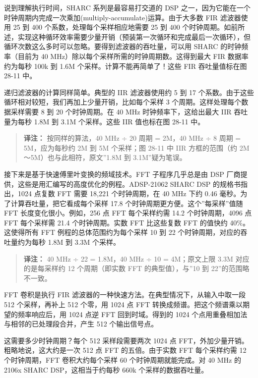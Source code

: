说到理解执行时间，SHARC 系列是最容易打交道的 DSP
之一，因为它能在一个时钟周期内完成一次乘加(multiply-accumulate)运算。由于大多数
FIR 滤波器使用 25 到 400 个系数，处理每个采样相应地需要 25 到 400
个时钟周期。如前所述，实现这种循环效率需要少量开销（预装第一次循环和完成最后一次循环），但循环次数这么多时可以忽略。要得到滤波器的吞吐量，可以用
SHARC 的时钟频率（目前为 40
MHz）除以每个采样所需的时钟周期数。这得到最大 FIR 数据率约为每秒 100k 到
1.6M 个采样。计算不能再简单了！这些 FIR 吞吐量值标在图 28-11 中。

递归滤波器的计算同样简单。典型的 IIR 滤波器使用约 5 到 17
个系数。由于这些循环相对较短，我们再加上少量开销，比如每个采样 3
个周期。这样处理每个数据采样需要 8 到 20 个时钟周期。在 40 MHz
时钟频率下，这给出最大 IIR 吞吐量为每秒 1.8M 到 3.1M 个采样。这些 IIR
值也标在图 28-11 中。

\begin{quote}
\textbf{译注：} 按同样的算法，40 MHz ÷ 20 周期 = 2M，40 MHz ÷ 8 周期 =
5M，应为每秒约 2M 到 5M 个采样；图 28-11 中 IIR 方框的范围（约
2M～5M）也与此相符，原文''1.8M 到 3.1M''疑为笔误。
\end{quote}

接下来是基于快速傅里叶变换的频域技术。FFT 子程序几乎总是由 DSP
厂商提供，这些是用汇编写的高度优化的例程。ADSP-21062 SHARC DSP
的规格书指出，1024 点复数 FFT 需要 18,221 个时钟周期，在 40 MHz 下约
0.46 毫秒。为了计算吞吐量，把它看成每个采样 17.8
个时钟周期更方便。这个''每采样''值随 FFT 长度变化很小。例如，256 点 FFT
每个采样约需 14.2 个时钟周期，4096 点 FFT 每个采样需 21.4
个时钟周期。实数 FFT 比这些复数 FFT 的值快约 40\%。这使得所有 FFT
例程的总体范围约为每个采样 10 到 22 个时钟周期，对应的吞吐量约为每秒
1.8M 到 3.3M 个采样。

\begin{quote}
\textbf{译注：} 40 MHz ÷ 22 = 1.8M，40 MHz ÷ 10 = 4M；原文上限 3.3M
对应的是每采样约 12 个周期（即实数 FFT 的典型值），与''10 到
22''的范围略不一致。
\end{quote}

FFT 卷积是执行 FIR 滤波器的一种快速方法。在典型情况下，从输入中取一段
512 个采样，再补上 512 个零，用 1024 点 FFT
转换成频谱。把这个频谱乘以期望的频率响应后，用 1024 点逆 FFT
回到时域。得到的 1024 个点用重叠相加法与相邻的已处理段合并，产生 512
个输出信号点。

这需要多少时钟周期？每个 512 采样段需要两次 1024 点
FFT，外加少量开销。粗略地说，这大约是一次 512 点 FFT 的五倍。由于实数
FFT 每个采样约需 12 个时钟周期，FFT 卷积大约每个采样 60
个时钟周期就能完成。对 40 MHz 的 2106x SHARC DSP，这相当于约每秒 660k
个采样的数据吞吐量。

